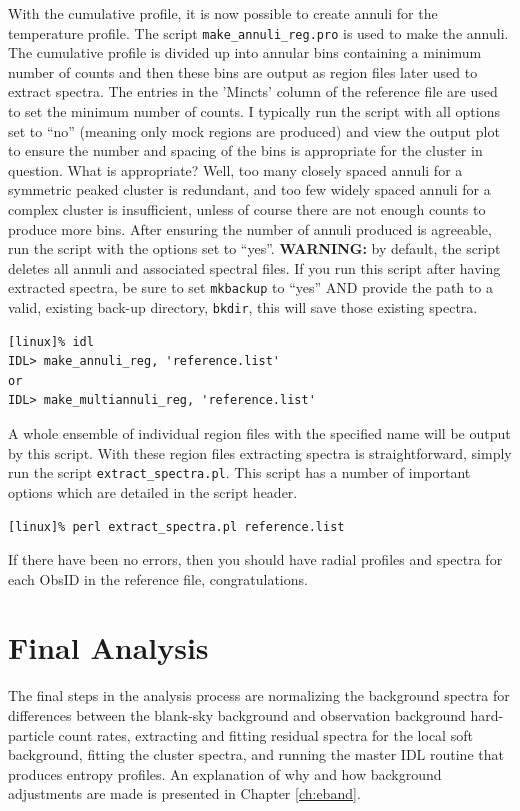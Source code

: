 With the cumulative profile, it is now possible to create annuli for
the temperature profile. The script {\tt{make\_annuli\_reg.pro}} is used
to make the annuli. The cumulative profile is divided up into annular
bins containing a minimum number of counts and then these bins are
output as region files later used to extract spectra. The entries in
the 'Mincts' column of the reference file are used to set the minimum
number of counts. I typically run the script with all options set to
``no'' (meaning only mock regions are produced) and view the output
plot to ensure the number and spacing of the bins is appropriate for
the cluster in question. What is appropriate? Well, too many closely
spaced annuli for a symmetric peaked cluster is redundant, and too few
widely spaced annuli for a complex cluster is insufficient, unless of
course there are not enough counts to produce more bins. After
ensuring the number of annuli produced is agreeable, run the script
with the options set to ``yes''. {\bf{WARNING:}} by default, the
script deletes all annuli and associated spectral files. If you run
this script after having extracted spectra, be sure to set
{\tt{mkbackup}} to ``yes'' AND provide the path to a valid, existing
back-up directory, {\tt{bkdir}}, this will save those existing
spectra.
\begin{verbatim}
[linux]% idl
IDL> make_annuli_reg, 'reference.list'
or
IDL> make_multiannuli_reg, 'reference.list'
\end{verbatim}
A whole ensemble of individual region files with the specified name
will be output by this script. With these region files extracting
spectra is straightforward, simply run the script
{\tt{extract\_spectra.pl}}. This script has a number of important
options which are detailed in the script header.
\begin{verbatim}
[linux]% perl extract_spectra.pl reference.list
\end{verbatim}

If there have been no errors, then you should have radial profiles and
spectra for each ObsID in the reference file, congratulations.

\section{Final Analysis}

The final steps in the analysis process are normalizing the background
spectra for differences between the blank-sky background and
observation background hard-particle count rates, extracting and
fitting residual spectra for the local soft background, fitting the
cluster spectra, and running the master IDL routine that produces
entropy profiles. An explanation of why and how background adjustments
are made is presented in Chapter \ref{ch:eband}.


